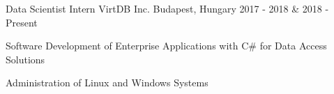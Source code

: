 

\begin{cventries}

  \cventry
    {Data Scientist Intern} %
    {VirtDB Inc.} %
    {Budapest, Hungary} %
    {2017 - 2018 \& 2018 - Present} %
    {
      \begin{cvitems} %
        \item {Software Development of Enterprise Applications with C\# for Data Access Solutions}
        \item {Administration of Linux and Windows Systems}        
      \end{cvitems}
    }

  
  
\end{cventries}
